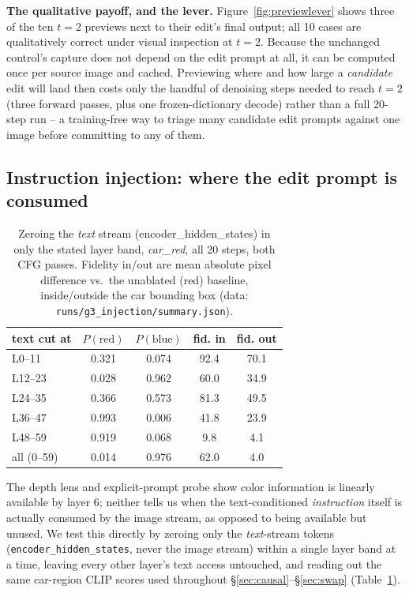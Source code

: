 \documentclass[10pt,twocolumn,letterpaper]{article}
\begin{document}
\textbf{The qualitative payoff, and the lever.} Figure~\ref{fig:previewlever}
shows three of the ten $t{=}2$ previews next to their edit's final
output; all 10 cases are qualitatively correct under visual inspection
at $t{=}2$. Because the unchanged control's capture does not depend on
the edit prompt at all, it can be computed once per source image and
cached. Previewing where and how large a \emph{candidate} edit will
land then costs only the handful of denoising steps needed to reach
$t{=}2$ (three forward passes, plus one frozen-dictionary decode)
rather than a full 20-step run -- a training-free way to triage many
candidate edit prompts against one image before committing to any of
them.

\subsection{Instruction injection: where the edit prompt is
consumed}\label{sec:injection}

\begin{table}[t]
\centering
\small
\begin{tabular}{lcccc}
\toprule
text cut at & $P(\text{red})$ & $P(\text{blue})$ & fid. in & fid. out \\
\midrule
L0--11  & 0.321 & 0.074 & 92.4 & 70.1 \\
L12--23 & 0.028 & 0.962 & 60.0 & 34.9 \\
L24--35 & 0.366 & 0.573 & 81.3 & 49.5 \\
L36--47 & 0.993 & 0.006 & 41.8 & 23.9 \\
L48--59 & 0.919 & 0.068 &  9.8 &  4.1 \\
all (0--59) & 0.014 & 0.976 & 62.0 &  4.0 \\
\bottomrule
\end{tabular}
\caption{Zeroing the \emph{text} stream (encoder\_hidden\_states) in only
the stated layer band, \emph{car\_red}, all 20 steps, both CFG passes.
Fidelity in/out are mean absolute pixel difference vs.\ the unablated
(red) baseline, inside/outside the car bounding box (data:
\texttt{runs/g3\_injection/summary.json}).}
\label{tab:injection}
\end{table}

The depth lens and explicit-prompt probe show color information is
linearly available by layer 6; neither tells us when the text-conditioned \emph{instruction}
itself is actually consumed by the image stream, as opposed to being
available but unused. We test this directly by zeroing only the
\emph{text}-stream tokens (\texttt{encoder\_hidden\_states}, never the
image stream) within a single layer band at a time, leaving every other
layer's text access untouched, and reading out the same car-region CLIP
scores used throughout \S\ref{sec:causal}--\S\ref{sec:swap}
(Table~\ref{tab:injection}).
\end{document}
